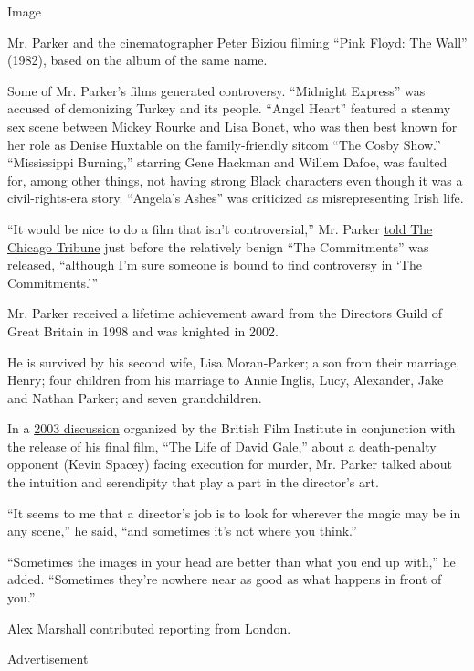 Image

Mr. Parker and the cinematographer Peter Biziou filming ``Pink Floyd:
The Wall'' (1982), based on the album of the same name.

Some of Mr. Parker's films generated controversy. ``Midnight Express''
was accused of demonizing Turkey and its people. ``Angel Heart''
featured a steamy sex scene between Mickey Rourke and
\href{https://decider.com/2019/10/03/angel-heart-walter-chaw/}{Lisa
Bonet}, who was then best known for her role as Denise Huxtable on the
family-friendly sitcom ``The Cosby Show.'' ``Mississippi Burning,''
starring Gene Hackman and Willem Dafoe, was faulted for, among other
things, not having strong Black characters even though it was a
civil-rights-era story. ``Angela's Ashes'' was criticized as
misrepresenting Irish life.

``It would be nice to do a film that isn't controversial,'' Mr. Parker
\href{https://www.chicagotribune.com/news/ct-xpm-1991-08-18-9103010538-story.html}{told
The Chicago Tribune} just before the relatively benign ``The
Commitments'' was released, ``although I'm sure someone is bound to find
controversy in `The Commitments.'''

Mr. Parker received a lifetime achievement award from the Directors
Guild of Great Britain in 1998 and was knighted in 2002.

He is survived by his second wife, Lisa Moran-Parker; a son from their
marriage, Henry; four children from his marriage to Annie Inglis, Lucy,
Alexander, Jake and Nathan Parker; and seven grandchildren.

In a
\href{https://www.bfi.org.uk/news-opinion/news-bfi/interviews/alan-parker-interview}{2003
discussion} organized by the British Film Institute in conjunction with
the release of his final film, ``The Life of David Gale,'' about a
death-penalty opponent (Kevin Spacey) facing execution for murder, Mr.
Parker talked about the intuition and serendipity that play a part in
the director's art.

``It seems to me that a director's job is to look for wherever the magic
may be in any scene,'' he said, ``and sometimes it's not where you
think.''

``Sometimes the images in your head are better than what you end up
with,'' he added. ``Sometimes they're nowhere near as good as what
happens in front of you.''

Alex Marshall contributed reporting from London.

Advertisement

